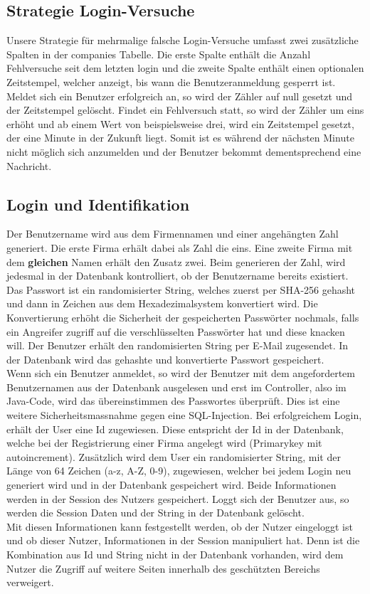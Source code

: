\documentclass[12pt]{scrartcl}
\begin{document}
\subsection{Strategie Login-Versuche}
Unsere Strategie für mehrmalige falsche Login-Versuche umfasst zwei zusätzliche Spalten in der companies Tabelle. Die erste Spalte enthält die Anzahl Fehlversuche seit dem letzten login und die zweite Spalte enthält einen optionalen Zeitstempel, welcher anzeigt, bis wann die Benutzeranmeldung gesperrt ist.\\
Meldet sich ein Benutzer erfolgreich an, so wird der Zähler auf null gesetzt und der Zeitstempel gelöscht. Findet ein Fehlversuch statt, so wird der Zähler um eins erhöht und ab einem Wert von beispielsweise drei, wird ein Zeitstempel gesetzt, der eine Minute in der Zukunft liegt. Somit ist es während der nächsten Minute nicht möglich sich anzumelden und der Benutzer bekommt dementsprechend eine Nachricht.

\subsection{Login und Identifikation}
Der Benutzername wird aus dem Firmennamen und einer angehängten Zahl generiert. Die erste Firma erhält dabei als Zahl die eins. Eine zweite Firma mit dem \textbf{gleichen} Namen erhält den Zusatz zwei. Beim generieren der Zahl, wird jedesmal in der Datenbank kontrolliert, ob der Benutzername bereits existiert.\\
Das Passwort ist ein randomisierter String, welches zuerst per SHA-256 gehasht und dann in Zeichen aus dem Hexadezimalsystem konvertiert wird. Die Konvertierung erhöht die Sicherheit der gespeicherten Passwörter nochmals, falls ein Angreifer zugriff auf die verschlüsselten Passwörter hat und diese knacken will. Der Benutzer erhält den randomisierten String per E-Mail zugesendet. In der Datenbank wird das gehashte und konvertierte Passwort gespeichert.\\
Wenn sich ein Benutzer anmeldet, so wird der Benutzer mit dem angefordertem Benutzernamen aus der Datenbank ausgelesen und erst im Controller, also im Java-Code, wird das übereinstimmen des Passwortes überprüft. Dies ist eine weitere Sicherheitsmassnahme gegen eine SQL-Injection. Bei erfolgreichem Login, erhält der User eine Id zugewiesen. Diese entspricht der Id in der Datenbank, welche bei der Registrierung einer Firma angelegt wird (Primarykey mit autoincrement). Zusätzlich wird dem User ein randomisierter String, mit der Länge von 64 Zeichen (a-z, A-Z, 0-9), zugewiesen, welcher bei jedem Login neu generiert wird und in der Datenbank gespeichert wird. Beide Informationen werden in der Session des Nutzers gespeichert. Loggt sich der Benutzer aus, so werden die Session Daten und der String in der Datenbank gelöscht.\\
Mit diesen Informationen kann festgestellt werden, ob der Nutzer eingeloggt ist und ob dieser Nutzer, Informationen in der Session manipuliert hat. Denn ist die Kombination aus Id und String nicht in der Datenbank vorhanden, wird dem Nutzer die Zugriff auf weitere Seiten innerhalb des geschützten Bereichs verweigert.
\end{document}
